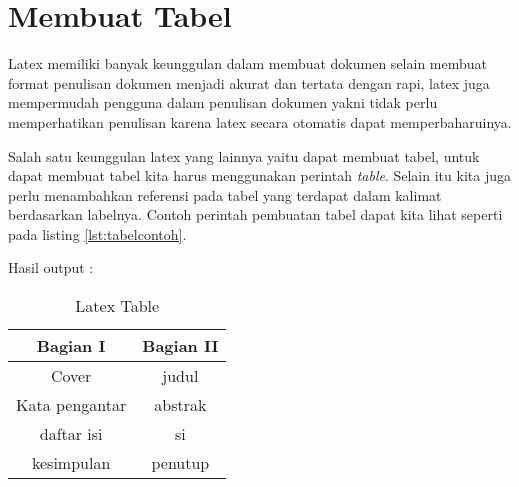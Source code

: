 \section{Membuat Tabel}
Latex memiliki banyak keunggulan dalam membuat dokumen selain membuat format penulisan dokumen menjadi akurat dan tertata dengan rapi, latex juga mempermudah pengguna dalam penulisan dokumen yakni tidak perlu memperhatikan penulisan karena latex secara otomatis dapat memperbaharuinya.

Salah satu keunggulan latex yang lainnya yaitu dapat membuat tabel, untuk dapat membuat tabel kita harus menggunakan perintah \textit{table}. Selain itu kita juga perlu menambahkan referensi pada tabel yang terdapat dalam kalimat berdasarkan labelnya. Contoh perintah pembuatan tabel dapat kita lihat seperti pada listing \ref{lst:tabelcontoh}.



Hasil output :

\begin{table}[h]
\caption{Latex Table}
\centering
\begin{tabular}{|c|c|}
\hline
\textbf{Bagian I}&\textbf{Bagian II}\\
\hline
Cover&judul\\
\hline
Kata pengantar&abstrak\\
\hline
daftar isi&si\\
\hline
kesimpulan&penutup\\
\hline
\end{tabular}
\label{table:permisalan}
\end{table}